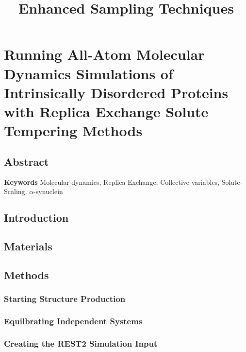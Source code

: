 \documentclass{memoir}
\title{Enhanced Sampling Techniques}
\begin{document}
\date{}

\maketitle

\tableofcontents

\chapter{Running All-Atom Molecular Dynamics Simulations of Intrinsically Disordered Proteins with Replica Exchange Solute Tempering Methods}

\section{Abstract}


\textbf{Keywords} Molecular dynamics, Replica Exchange, Collective variables, Solute-Scaling, $\alpha$-synuclein

\section{Introduction}\label{sec:Intro}

    





\section{Materials}



\section{Methods}

\subsection{Starting Structure Production}

\subsection{Equilbrating Independent Systems}

\subsection{Creating the REST2 Simulation Input}

\end{document}
